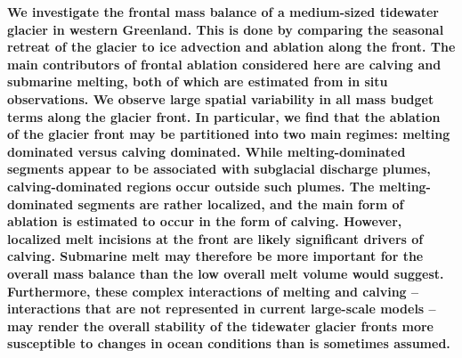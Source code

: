 \documentclass[10pt,letterpaper]{article}
\begin{document}
{\sf \textbf{\small{
We investigate the frontal mass balance of a medium-sized tidewater glacier in western Greenland. This is done by comparing the seasonal retreat of the glacier to ice advection and ablation along the front. The main contributors of frontal ablation considered here are calving and submarine melting, both of which are estimated from in situ observations.  We observe large spatial variability in all mass budget terms along the glacier front. 
In particular, we find that the ablation of the glacier front may be partitioned into two main regimes: melting dominated versus calving dominated. While melting-dominated segments appear to be associated with subglacial discharge plumes, calving-dominated regions occur outside such plumes. The melting-dominated segments are rather localized, and the main form of ablation is estimated to occur in the form of calving. However, localized melt incisions at the front are likely significant drivers of calving. Submarine melt may therefore be more important for the overall mass balance than the low overall melt volume would suggest. Furthermore, these complex interactions of melting and calving -- interactions that are not represented in current large-scale models -- may render the overall stability of the tidewater glacier fronts more susceptible to changes in ocean conditions than is sometimes assumed.
}}}
\vspace*{.05in}
\end{document}
